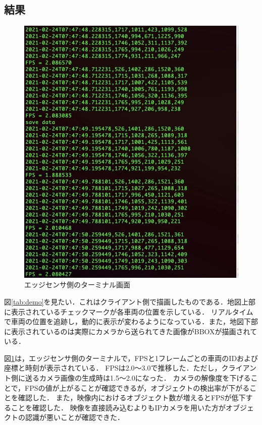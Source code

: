 \documentclass[technicalreport]{ieicej}
\begin{document}
\subsection{結果}
\begin{figure}[t]
  \includegraphics*[bb=0 100 200 400, width=1\linewidth]{./images/term.png}
  \caption{エッジセンサ側のターミナル画面} 
  \label{tab:term}
\end{figure}
図\ref{tab:demo}を見たい．これはクライアント側で描画したものである．地図上部に表示されているチェックマークが各車両の位置を示している．
リアルタイムで車両の位置を追跡し，動的に表示が変わるようになっている．また，地図下部に表示されているのは実際にカメラから送られてきた画像がBBOXが描画されている．

図\ref{tab:term}は，エッジセンサ側のターミナルで，FPSと1フレームごとの車両のIDおよび座標と時刻が表示されている．
FPSは2.0〜3.0で推移した．ただし，クライアント側に送るカメラ画像の生成時は1.5〜2.0になった．
カメラの解像度を下げることで，FPSの値が上がることが確認できるが，オブジェクトの検出率が下がることを確認した．
また，映像内におけるオブジェクト数が増えるとFPSが低下することを確認した．
映像を直接読み込むよりもIPカメラを用いた方がオブジェクトの認識が悪いことが確認できた．
\end{document}
